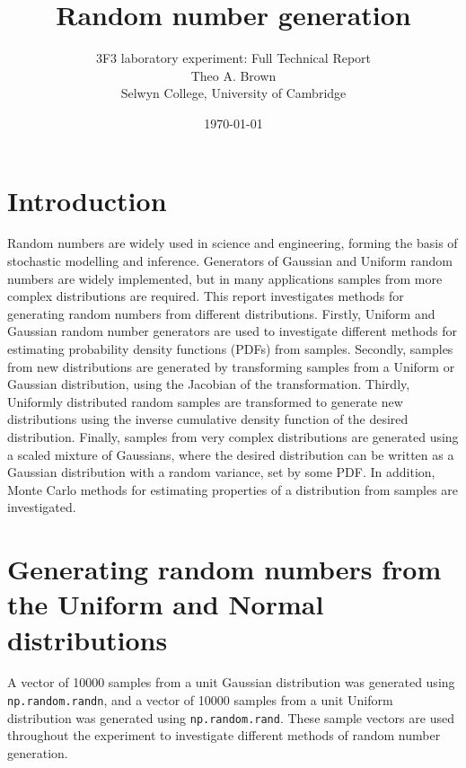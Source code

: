 \documentclass[a4paper]{article}
\begin{document}

\title{Random number generation}
\author{3F3 laboratory experiment: Full Technical Report \\ Theo A. Brown \\ Selwyn College, University of Cambridge}
\date{\today}
\maketitle

\tableofcontents
\newpage


\section{Introduction}
Random numbers are widely used in science and engineering, forming the basis of stochastic modelling and inference.
Generators of Gaussian and Uniform random numbers are widely implemented, but in many applications samples from more
complex distributions are required.
This report investigates methods for generating random numbers from different distributions.
Firstly, Uniform and Gaussian random number generators are used to investigate different methods for estimating
probability density functions (PDFs) from samples.
Secondly, samples from new distributions are generated by transforming samples from a Uniform or Gaussian distribution,
using the Jacobian of the transformation.
Thirdly, Uniformly distributed random samples are transformed to generate new distributions using the inverse
cumulative density function of the desired distribution.
Finally, samples from very complex distributions are generated using a scaled mixture of Gaussians, where the desired
distribution can be written as a Gaussian distribution with a random variance, set by some PDF.
In addition, Monte Carlo methods for estimating properties of a distribution from samples are investigated.



\section{Generating random numbers from the Uniform and Normal distributions}
\label{sec:uniform_normal}

A vector of 10000 samples from a unit Gaussian distribution was generated using \verb`np.random.randn`, and a vector of
10000 samples from a unit Uniform distribution was generated using \verb`np.random.rand`.
These sample vectors are used throughout the experiment to investigate different methods of random number generation.
\end{document}
